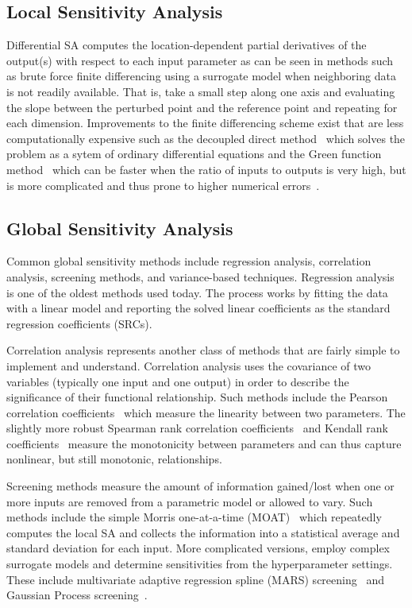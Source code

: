 \subsection{Local Sensitivity Analysis}

Differential SA computes the location-dependent partial derivatives of the output(s) with respect to each input parameter as can be seen in methods such as brute force finite differencing using a surrogate model when neighboring data is not readily available.
%
That is, take a small step along one axis and evaluating the slope between the perturbed point and the reference point and repeating for each dimension.
%
Improvements to the finite differencing scheme exist that are less computationally expensive such as the decoupled direct method~\cite{Dunker1981,Dunker1984} which solves the problem as a sytem of ordinary differential equations and the Green function method~\cite{KramerCaloRabitz1981} which can be faster when the ratio of inputs to outputs is very high, but is more complicated and thus prone to higher numerical errors~\cite{SaltelliChanScott2000}.

\subsection{Global Sensitivity Analysis}

Common global sensitivity methods include regression analysis, correlation analysis, screening methods, and variance-based techniques.
%
Regression analysis~\cite{Galton1886} is one of the oldest methods used today.
%
The process works by fitting the data with a linear model and reporting the solved linear coefficients as the standard regression coefficients (SRCs).

Correlation analysis represents another class of methods that are fairly simple to implement and understand.
%
Correlation analysis uses the covariance of two variables (typically one input and one output) in order to describe the significance of their functional relationship.
%
Such methods include the Pearson correlation coefficients~\cite{Pearson1895} which measure the linearity between two parameters.
%
The slightly more robust Spearman rank correlation coefficients~\cite{Spearman1904a} and Kendall rank coefficients~\cite{KendallGibbons1990} measure the monotonicity between parameters and can thus capture nonlinear, but still monotonic, relationships.

Screening methods measure the amount of information gained/lost when one or more inputs are removed from a parametric model or allowed to vary.
%
Such methods include the simple Morris one-at-a-time (MOAT)~\cite{Morris1991} which repeatedly computes the local SA and collects the information into a statistical average and standard deviation for each input.
%
More complicated versions, employ complex surrogate models and determine sensitivities from the hyperparameter settings.
%
These include multivariate adaptive regression spline (MARS) screening~\cite{Friedman1991} and Gaussian Process screening~\cite{RasmussenWilliams2006}.

